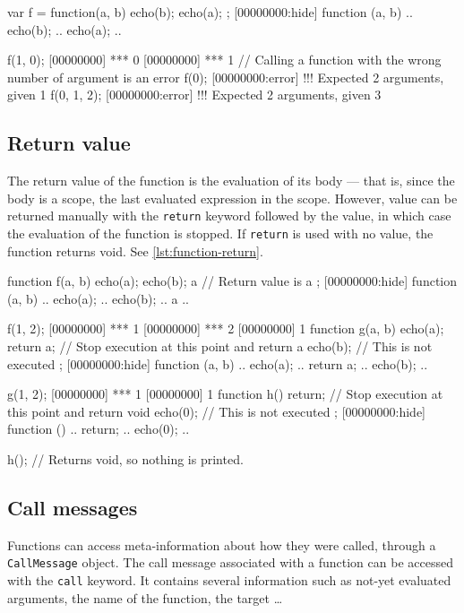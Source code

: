 \begin{urbiscript}[caption=Storing and calling
  functions,label=lst:function-args,float=\floatpos]
var f = function(a, b) {
  echo(b);
  echo(a);
};
[00000000:hide] function (a, b) {
..  echo(b);
..  echo(a);
..}

f(1, 0);
[00000000] *** 0
[00000000] *** 1
// Calling a function with the wrong number of argument is an error
f(0);
[00000000:error] !!! Expected 2 arguments, given 1
f(0, 1, 2);
[00000000:error] !!! Expected 2 arguments, given 3
\end{urbiscript}

\subsection{Return value}

The return value of the function is the evaluation of its body --- that
is, since the body is a scope, the last evaluated expression in the
scope. However, value can be returned manually with the
\lstinline|return| keyword followed by the value, in which case the
evaluation of the function is stopped. If \lstinline|return| is used
with no value, the function returns void. See \autoref{lst:function-return}.

\begin{urbiscript}[caption=Returning values from functions,
  label=lst:function-return,float=\floatpos]
function f(a, b)
{
  echo(a);
  echo(b);
  a // Return value is a
};
[00000000:hide] function (a, b) {
..  echo(a);
..  echo(b);
..  a
..}

f(1, 2);
[00000000] *** 1
[00000000] *** 2
[00000000] 1
function g(a, b)
{
  echo(a);
  return a; // Stop execution at this point and return a
  echo(b); // This is not executed
};
[00000000:hide] function (a, b) {
..  echo(a);
..  return a;
..  echo(b);
..}

g(1, 2);
[00000000] *** 1
[00000000] 1
function h()
{
  return; // Stop execution at this point and return void
  echo(0); // This is not executed
};
[00000000:hide] function () {
..  return;
..  echo(0);
..}

h(); // Returns void, so nothing is printed.
\end{urbiscript}

\subsection{Call messages}
\label{sec:us-fun-callmsg}

Functions can access meta-information about how they were called,
through a \lstinline|CallMessage| object. The call message associated
with a function can be accessed with the \lstinline|call| keyword. It
contains several information such as not-yet evaluated arguments, the
name of the function, the target \ldots

